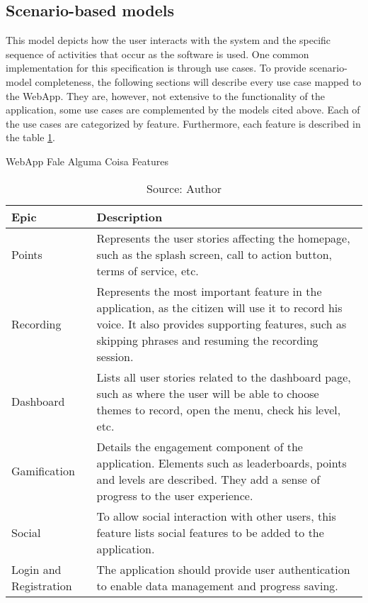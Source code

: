\subsection{Scenario-based models}

This model depicts how the user interacts with the system and the specific sequence of activities that occur as the software is used. One common implementation for this specification is through use cases. To provide scenario-model completeness, the following sections will describe every use case mapped to the WebApp. They are, however, not extensive to the functionality of the application, some use cases are complemented by the models cited above. Each of the use cases are categorized by feature. Furthermore, each feature is described in the table \ref{tab:falealgumacoisa-features}.

\begin{table}[h]
    \centering
    \caption{WebApp Fale Alguma Coisa Features}
    \label{tab:falealgumacoisa-features}
    \begin{tabular}{|p{3cm}|p{10cm}|}
        \hline Epic & Description \\
        \hline Points & Represents the user stories affecting the homepage, such as the splash screen, call to action button, terms of service, etc. \\
        \hline Recording & Represents the most important feature in the application, as the citizen will use it to record his voice. It also provides supporting features, such as skipping phrases and resuming the recording session.\\ 
        \hline Dashboard & Lists all user stories related to the dashboard page, such as where the user will be able to choose themes to record, open the menu, check his level, etc. \\
        \hline Gamification & Details the engagement component of the application. Elements such as leaderboards, points and levels are described. They add a sense of progress to the user experience. \\
        \hline Social & To allow social interaction with other users, this feature lists social features to be added to the application. \\
        \hline Login and Registration & The application should provide user authentication to enable data management and progress saving. \\
        \hline
    \end{tabular}
    \caption*{Source: Author}
\end{table}

